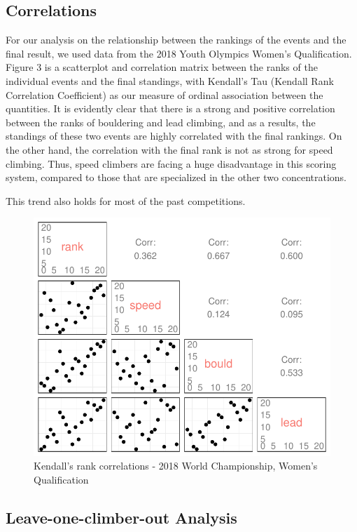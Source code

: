 \documentclass[12pt]{article}
\begin{document}
\hypertarget{correlations}{%
\subsection{Correlations}\label{correlations}}

For our analysis on the relationship between the rankings of the events
and the final result, we used data from the 2018 Youth Olympics Women's
Qualification. Figure 3 is a scatterplot and correlation matrix between
the ranks of the individual events and the final standings, with
Kendall's Tau (Kendall Rank Correlation Coefficient) as our measure of
ordinal association between the quantities. It is evidently clear that
there is a strong and positive correlation between the ranks of
bouldering and lead climbing, and as a results, the standings of these
two events are highly correlated with the final rankings. On the other
hand, the correlation with the final rank is not as strong for speed
climbing. Thus, speed climbers are facing a huge disadvantage in this
scoring system, compared to those that are specialized in the other two
concentrations.

This trend also holds for most of the past competitions.

\begin{figure}[H]
\centering
\includegraphics{draft_files/figure-latex/unnamed-chunk-10-1.pdf}
\caption{Kendall's rank correlations - 2018 World Championship, Women's
Qualification}
\end{figure}

\hypertarget{leave-one-climber-out-analysis}{%
\subsection{Leave-one-climber-out
Analysis}\label{leave-one-climber-out-analysis}}
\end{document}

